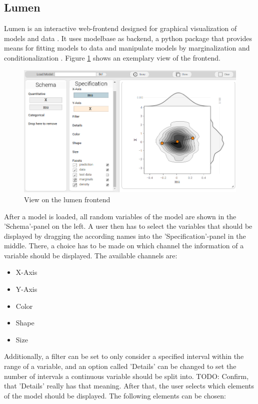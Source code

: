 \documentclass{article}
\begin{document}
\subsection{Lumen}
Lumen is an interactive web-frontend designed for graphical visualization of models and data \cite{Lucas2016a}. It uses modelbase as backend, a python package that provides means for fitting models to data and manipulate models by marginalization and conditionalization \cite{Lucas2016b}. Figure \ref{fig:lumen_screenshot} shows an exemplary view of the frontend.
\begin{figure}
	\includegraphics[width=\textwidth]{images/lumen_screenshot.png}
	\caption{View on the lumen frontend}
	\label{fig:lumen_screenshot}
\end{figure}
After a model is loaded, all random variables of the model are shown in the 'Schema'-panel on the left. A user then has to select the variables that should be displayed by dragging the according names into the 'Specification'-panel in the middle. There, a choice has to be made on which channel the information of a variable should be displayed. The available channels are:
\begin{itemize}
	\item X-Axis
	\item Y-Axis
	\item Color
	\item Shape
	\item Size
\end{itemize}
Additionally, a filter can be set to only consider a specified interval within the range of a variable, and an option called 'Details' can be changed to set the number of intervals a continuous variable should be split into. TODO: Confirm, that 'Details' really has that meaning. After that, the user selects which elements of the model should be displayed. The following elements can be chosen:
\end{document}
